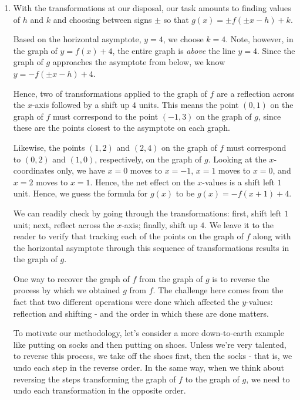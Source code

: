 \begin{ex}
\begin{enumerate}
\begin{enumerate}
 \end{enumerate}

 \item With the transformations at our disposal,  our task amounts to finding values of $h$ and $k$ and choosing between signs $\pm$  so that  $g(x) = \pm f( \pm x - h) + k$.  
 
 Based on the horizontal asymptote, $y=4$, we choose $k=4$.  Note, however, in the graph of $y=f(x)+4$, the entire graph is \textit{above} the line $y=4$.  Since the graph of $g$ approaches the asymptote from below, we know  $y=-f(\pm x-h)+4$.  
 
 Hence, two of transformations applied to the graph of $f$ are a reflection across the $x$-axis followed by a shift up $4$ units.  This means the point $(0,1)$ on the graph of $f$ must correspond to the point $(-1,3)$ on the graph of $g$, since these are the points closest to the asymptote on each graph.  
  
Likewise, the points $(1,2)$ and $(2,4)$ on the graph of $f$ must correspond to $(0,2)$ and $(1,0)$, respectively, on the graph of $g$.  Looking at the $x$-coordinates only, we have $x=0$ moves to $x=-1$, $x=1$ moves to $x=0$, and $x=2$ moves to $x=1$.  Hence, the net effect on the $x$-values is a shift left $1$ unit.  Hence, we guess the formula for $g(x)$ to be $g(x) = -f(x+1)+4$.  

We can readily check by going through the transformations:  first, shift left $1$ unit; next,  reflect across the $x$-axis;  finally, shift up $4$.  We leave it to the reader to verify that tracking each of the points on the graph of $f$ along with the horizontal asymptote through this sequence of transformations results in the graph of $g$.  
 
 One way to recover the graph of $f$ from the graph of $g$ is to reverse the process by which we obtained $g$ from $f$.  The challenge here comes from the fact that two different operations were done which affected the $y$-values:  reflection and shifting - and the order in which these are done matters.  
 
 To motivate our methodology, let's consider a more down-to-earth example like putting on socks and then putting on shoes.  Unless we're very talented,  to reverse this process, we take off the shoes first, then the socks - that is, we undo each step in the reverse order.  In the same way, when we think about reversing the steps transforming the graph of $f$ to the graph of $g$, we need to undo each transformation in the opposite order.  
 

\end{enumerate}
\end{ex}
